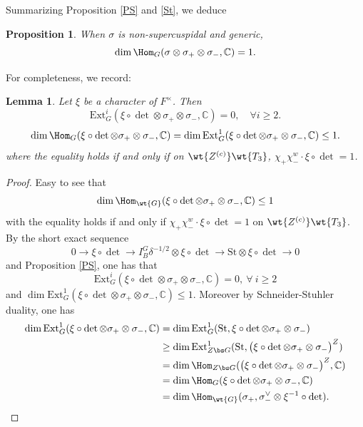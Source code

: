 \documentclass[11pt,reqno]{amsart}
\newcommand{\BC}{{\mathbb {C}}} \newcommand{\BD}{{\mathbb {D}}}
\newcommand{\St}{{\mathrm{St}}}\newcommand{\SU}{{\mathrm{SU}}}
\newcommand{\Ext}{{\mathrm{Ext}}}
\newcommand{\lra}{\longrightarrow}\newcommand{\lla}{\longleftarrow}
\theoremstyle{plain}
\newtheorem{lem}[thm]{Lemma}  \newtheorem{prop}[thm]{Proposition}
\theoremstyle{remark} \newtheorem{remark}[thm]{Remark}
\theoremstyle{definition} \newtheorem{exercise}[thm]{Exercise}
\theoremstyle{definition} \newtheorem{example}[thm]{Example} \newtheorem{condition}[thm]{Condition}
\numberwithin{equation}{section}
\renewcommand{\-}{\text{--}}
\begin{document}
 Summarizing Proposition \ref{PS} and \ref{St}, we deduce
 \begin{prop}\label{n-SC} When $\sigma$ is non-supercuspidal and generic, 
 \[\dim \Hom_G(\sigma\otimes\sigma_+\otimes\sigma_-,\BC)=1.\]
 \end{prop}
 For completeness, we record:
 \begin{lem}\label{one-dim}Let $\xi$ be a character of $F^\times$. Then $$\Ext^i_G(\xi\circ\det\otimes \sigma_+\otimes \sigma_-,\BC)=0,\quad \forall i\geq2.$$ 
$$\dim\Hom_G(\xi\circ\det\otimes \sigma_{+}\otimes \sigma_{-},\BC)=\dim\Ext^1_G(\xi\circ\det\otimes \sigma_{+}\otimes \sigma_{-},\BC)\leq1.$$
where the equality holds if and only if on $\wt{Z^{(c)}}\wt{T_3}$, $\chi_+\chi_{-}^w\cdot\xi\circ\det=1$. 
\end{lem}
\begin{proof}Easy to see that$$\dim\Hom_{\wt{G}}(\xi\circ\det\otimes \sigma_{+}\otimes \sigma_{-},\BC)\leq1$$
with the equality holds if and only if  $\chi_+\chi_{-}^w\cdot \xi\circ\det=1$ on $\wt{Z^{(c)}}\wt{T_3}$. By the short exact sequence $$0\lra \xi\circ\det\lra I_B^G\delta^{-1/2}\otimes\xi\circ\det\lra\St\otimes\xi\circ\det\lra0$$
and Proposition  \ref{PS}, one has  that 
$$\Ext^i_G(\xi\circ\det\otimes \sigma_{+}\otimes \sigma_{-},\BC)=0,\ \forall\ i\geq2$$
and $\dim\Ext^1_G(\xi\circ\det\otimes \sigma_{+}\otimes \sigma_{-},\BC)\leq1$. Moreover by Schneider-Stuhler duality, one has 
\begin{align*}
    \dim\Ext^1_G(\xi\circ\det\otimes \sigma_{+}\otimes \sigma_{-},\BC)&=\dim\Ext^1_G(\St, \xi\circ\det\otimes  \sigma_{+}\otimes \sigma_{-})\\
   &\geq \dim\Ext^1_{Z\bs G}(\St, \big(\xi\circ\det\otimes \sigma_{+}\otimes \sigma_{-}\big)^Z)\\
 &=\dim\Hom_{Z\bs G}(\big(\xi\circ\det\otimes  \sigma_{+}\otimes \sigma_{-}\big)^Z,\BC)\\
  &=\dim\Hom_G(\xi\circ\det\otimes \sigma_{+}\otimes \sigma_{-},\BC)\\
 &=\dim\Hom_{\wt{G}}(\sigma_+, \sigma_{-}^\vee\otimes \xi^{-1}\circ\det).
\end{align*}
\end{proof}
\end{document}
